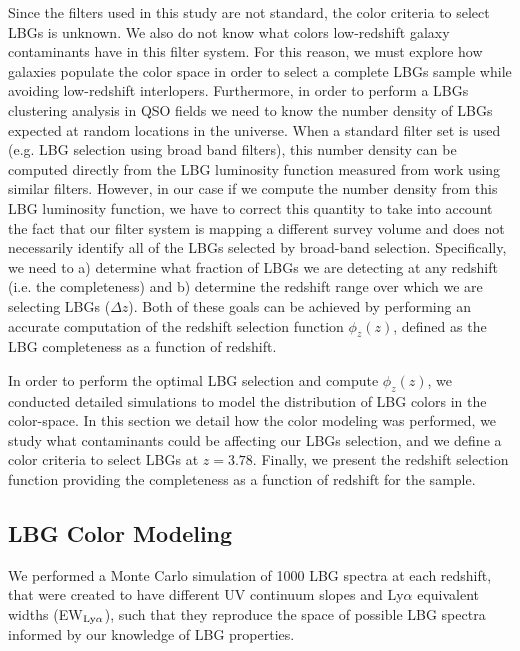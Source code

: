 \documentclass[iop, revtex4]{emulateapj}
\begin{document}
Since the filters used in this study are not standard, the color
criteria to select LBGs is unknown. We also do not know what colors
low-redshift galaxy contaminants have in this filter system. For this
reason, we must explore how galaxies populate the color space in order
to select a complete LBGs sample while avoiding low-redshift
interlopers. Furthermore, in order to perform a LBGs clustering
analysis in QSO fields we need to know the number density of LBGs
expected at random locations in the universe. When a standard filter
set is used (e.g. LBG selection using broad band filters),
this number density can be computed directly from the LBG luminosity
function measured from work using similar filters.
However, in our case if we compute the number density from this LBG
luminosity function, we have to correct this quantity to take into
account the fact that our filter system is mapping a different survey
volume and does not necessarily identify all of the LBGs selected by
broad-band selection.
Specifically, we need to a) determine what fraction of LBGs
we are detecting at any redshift (i.e. the completeness) and b)
determine the redshift range over which we are selecting LBGs ($\Delta
z$). Both of these goals can be achieved by performing an accurate computation of
the redshift selection function $\phi_{z}(z)$, defined as the LBG
completeness as a function of redshift.

In order to perform the optimal LBG selection and compute $\phi_{z}(z)$, we conducted detailed
simulations to model the distribution of LBG colors in the color-space. In this section
we detail how the color modeling was performed, we study what contaminants could be affecting our LBGs selection, and we define a color criteria to select LBGs at $z=3.78$. Finally, we present the redshift selection function providing the completeness as a function of
redshift for the sample.

\subsection{LBG Color Modeling}
\label{sec:modeling}

We performed a Monte Carlo simulation of 1000 LBG spectra at each redshift, that were created to have 
different UV continuum slopes and Ly$\alpha$ equivalent widths (EW$_{\rm
  Ly\alpha}$), such that they reproduce the space of
possible LBG spectra informed by our knowledge of LBG properties.  
\end{document}
